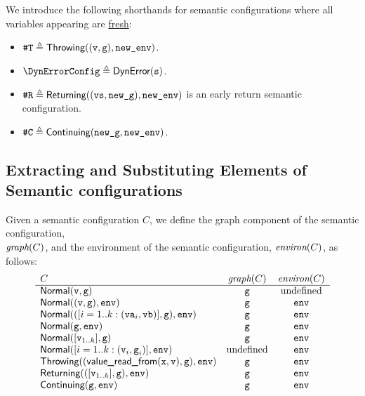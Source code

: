 We introduce the following shorthands for semantic configurations where all variables
appearing are \hyperlink{def-freshvariables}{fresh}:
\begin{itemize}
\hypertarget{def-throwingconfig}{}
\item $\ThrowingConfig \triangleq \Throwing((\vv, \vg), \newenv)$.
\hypertarget{def-errorconfig}{}
\item $\DynErrorConfig \triangleq \Error(\vs)$.
\hypertarget{def-returningconfig}{}
\item $\ReturningConfig \triangleq \Returning((\vvs,\newg), \newenv)$
is an early return semantic configuration.
\hypertarget{def-continuingconfig}{}
\item $\ContinuingConfig \triangleq \Continuing(\newg, \newenv)$.
\end{itemize}

\subsection{Extracting and Substituting Elements of Semantic configurations}

\hypertarget{def-graphof}{}
\hypertarget{def-environof}{}
Given a semantic configuration $C$, we define the graph component of the semantic configuration, \\
$\textit{graph}({C})$, and the environment of the semantic configuration, $\textit{environ}({C})$, as follows:
\[
\begin{array}{lcc}
  C & \textit{graph}({C}) & \textit{environ}({C})\\
  \hline
  \textsf{Normal}(\texttt{v},\texttt{g}) & \texttt{g} & \text{undefined}\\
  \textsf{Normal}((\texttt{v},\texttt{g}), \texttt{env}) & \texttt{g} & \texttt{env}\\
  \textsf{Normal}(([i=1..k: (\texttt{va}_i,\texttt{vb})],\texttt{g}), \texttt{env}) & \texttt{g} & \texttt{env}\\
  \textsf{Normal}(\texttt{g}, \texttt{env}) & \texttt{g} & \texttt{env}\\
  \textsf{Normal}([\texttt{v}_{1..k}], \texttt{g}) & \texttt{g} & \texttt{env}\\
  \textsf{Normal}([i=1..k: (\texttt{v}_i,\texttt{g}_i)], \texttt{env}) & \text{undefined} & \texttt{env}\\
  \textsf{Throwing}((\textsf{value\_read\_from}(\texttt{x},\texttt{v}),\texttt{g}), \texttt{env}) & \texttt{g} & \texttt{env}\\
  \textsf{Returning}(([\texttt{v}_{1..k}],\texttt{g}), \texttt{env}) & \texttt{g} & \texttt{env}\\
  \textsf{Continuing}(\texttt{g}, \texttt{env}) & \texttt{g} & \texttt{env}\\
\end{array}
\]


